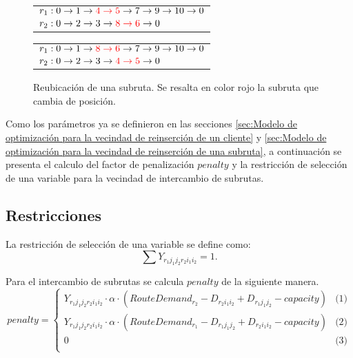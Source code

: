 \documentclass[12pt]{report}
\begin{document}
		\begin{figure}[h!]
		\centering
		\begin{minipage}{0.45\textwidth}
			\begin{tabular}{l}
				$r_1:  0 \rightarrow 1\rightarrow \textcolor{red}{4 \rightarrow 5} \rightarrow 7 \rightarrow 9 \rightarrow 10 \rightarrow  0$\\
				$r_2:  0\rightarrow 2\rightarrow 3\rightarrow \textcolor{red}{8 \rightarrow 6} \rightarrow  0$\\
			\end{tabular}
		\end{minipage}
		\hfill
		\begin{minipage}{0.45\textwidth}
			\begin{tabular}{l}
				$r_1:  0 \rightarrow 1\rightarrow  \textcolor{red}{8 \rightarrow 6} \rightarrow 7 \rightarrow 9 \rightarrow 10 \rightarrow  0$\\
				$r_2:  0\rightarrow 2\rightarrow 3\rightarrow \textcolor{red}{4 \rightarrow 5} \rightarrow  0$\\
			\end{tabular}
		\end{minipage}

		\caption{Reubicación de una subruta. Se resalta en color rojo la subruta que cambia de posición.}
		\label{variable-3}
	\end{figure}

	Como los parámetros ya se definieron en las secciones \ref{sec:Modelo de optimización para la vecindad de reinserción de un cliente} y \ref{sec:Modelo de optimización para la vecindad de reinserción de una subruta}, a continuación se presenta el calculo del factor de penalización $penalty$ y la restricción de selección de una variable para la vecindad de intercambio de subrutas.

	\subsection{Restricciones}

	La restricción de selección de una variable se define como:
	\[
	\sum  Y_{r_1j_1j_2r_2i_1i_2} = 1.
	\]

	Para el intercambio de subrutas se calcula $penalty$ de la siguiente manera.
	\[ 			penalty =
	\begin{cases}
		Y_{r_1j_1j_2r_2i_1i_2} \cdot \alpha \cdot (RouteDemand_{r_2} - D_{r_2i_1i_2} + D_{r_1j_1j_2} - capacity) & \text{(1)} \\
		Y_{r_1j_1j_2r_2i_1i_2} \cdot \alpha \cdot (RouteDemand_{r_1} - D_{r_1j_1j_2} + D_{r_2i_1i_2} - capacity) & \text{(2)} \\
		0 & \text{(3)}\\
	\end{cases} \]
\end{document}

